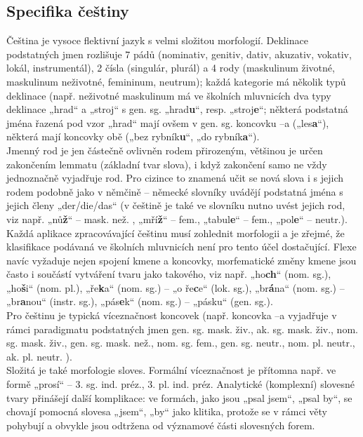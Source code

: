 \begin{multicols}{2}
\subsection{Specifika češtiny}

Čeština je vysoce flektivní jazyk s velmi složitou morfologií. Deklinace podstatných jmen rozlišuje 7 pádů (nominativ, genitiv, dativ, akuzativ, vokativ, lokál, instrumentál), 2 čísla (singulár, plurál) a 4 rody (maskulinum životné, maskulinum neživotné, femininum, neutrum); každá kategorie má několik typů deklinace (např. neživotné maskulinum má ve školních mluvnicích dva typy deklinace „hrad“ a „stroj“ s gen. sg. „hrad\textbf{u}“, resp. „stroj\textbf{e}“; některá podstatná jména řazená pod vzor „hrad“ mají ovšem v gen. sg. koncovku –a („les\textbf{a}“), některá mají koncovky obě („bez rybník\textbf{u}“, „do rybník\textbf{a}“).\\
Jmenný rod je jen částečně ovlivněn rodem přirozeným, většinou je určen zakončením lemmatu (základní tvar slova), i když zakončení samo ne vždy jednoznačně vyjadřuje rod. Pro cizince to znamená učit se nová slova i s jejich rodem podobně jako v němčině – německé slovníky uvádějí podstatná jména s jejich členy „der/die/das“ (v češtině je také ve slovníku nutno uvést jejich rod, viz např. „nů\textbf{ž}“ – mask. než. , „mří\textbf{ž}“ – fem., „tabul\textbf{e}“ – fem., „pol\textbf{e}“ – neutr.).\\
Každá aplikace zpracovávající češtinu musí zohlednit morfologii a je zřejmé, že klasifikace podávaná ve školních mluvnicích není pro tento účel dostačující. Flexe navíc vyžaduje nejen spojení kmene a koncovky, morfematické změny kmene jsou často i součástí vytváření tvaru jako takového, viz např. „ho\textbf{ch}“ (nom. sg.), „ho\textbf{š}i“ (nom. pl.), „ře\textbf{k}a“ (nom. sg.) – „o ře\textbf{c}e“ (lok. sg.), „br\textbf{á}na“ (nom. sg.) – „br\textbf{a}nou“ (instr. sg.), „pás\textbf{e}k“ (nom. sg.) – „pásku“ (gen. sg.).\\
Pro češtinu je typická víceznačnost koncovek (např. koncovka –a vyjadřuje v rámci paradigmatu podstatných jmen gen. sg. mask. živ., ak. sg. mask. živ., nom. sg. mask. živ., gen. sg. mask. než., nom. sg. fem., gen. sg. neutr., nom. pl. neutr., ak. pl. neutr. ).\\
Složitá je také morfologie sloves. Formální víceznačnost je přítomna např. ve formě „prosí“ – 3. sg. ind. préz., 3. pl. ind. préz. Analytické (komplexní) slovesné tvary přinášejí další komplikace: ve formách, jako jsou „psal jsem“, „psal by“, se chovají pomocná slovesa „jsem“, „by“ jako klitika, protože se  v rámci věty pohybují a obvykle jsou odtržena od významové části slovesných forem.\\

\end{multicols}
